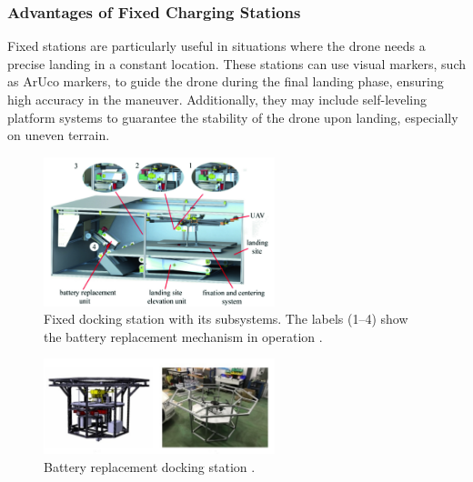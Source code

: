 \subsubsection{Advantages of Fixed Charging Stations}

    Fixed stations are particularly useful in situations where the drone needs a precise landing in a constant location. These stations can use visual markers, such as ArUco \cite{grlj_docking_stations} markers, to guide the drone during the final landing phase, ensuring high accuracy in the maneuver. Additionally, they may include self-leveling platform systems to guarantee the stability of the drone upon landing, especially on uneven terrain.

    \begin{figure}[H]
        \centering
        \includegraphics[width=0.6\textwidth]{pictures/fixed_charging_1.png}
        \caption{Fixed docking station with its subsystems. The labels (1–4) show the battery replacement mechanism in operation \cite{grlj_docking_stations}.}
        \label{fig:fixed_charging}
    \end{figure}

    \begin{figure}[H]
        \centering
        \includegraphics[width=0.6\textwidth]{pictures/fixed_2.png}
        \caption{Battery replacement docking station \cite{grlj_docking_stations}.}
        \label{fig:fixed_charging}
    \end{figure}

